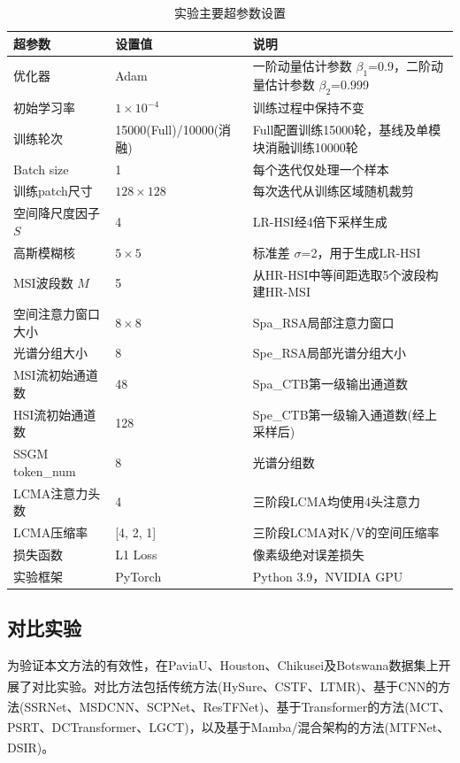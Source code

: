 \documentclass[UTF8,a4paper,11pt]{ctexart}
\newcommand{\upcite}[1]{\textsuperscript{\cite{#1}}}
\begin{document}
\begin{table}[!htbp]
\centering\small
\caption{实验主要超参数设置}
\label{tab:hyper}
\begin{tabularx}{\linewidth}{@{}llX@{}}
\toprule
超参数 & 设置值 & 说明 \\
\midrule
优化器           & Adam                      & 一阶动量估计参数 $\beta_1$=0.9，二阶动量估计参数 $\beta_2$=0.999 \\
初始学习率       & $1\times10^{-4}$          & 训练过程中保持不变 \\
训练轮次         & 15000(Full)/10000(消融)   & Full配置训练15000轮，基线及单模块消融训练10000轮 \\
Batch size       & 1                         & 每个迭代仅处理一个样本 \\
训练patch尺寸    & $128 \times 128$          & 每次迭代从训练区域随机裁剪 \\
空间降尺度因子 $S$ & 4                       & LR-HSI经4倍下采样生成 \\
高斯模糊核       & $5 \times 5$              & 标准差 $\sigma$=2，用于生成LR-HSI \\
MSI波段数 $M$    & 5                         & 从HR-HSI中等间距选取5个波段构建HR-MSI \\
空间注意力窗口大小 & $8 \times 8$            & Spa\_RSA局部注意力窗口 \\
光谱分组大小     & 8                         & Spe\_RSA局部光谱分组大小 \\
MSI流初始通道数  & 48                        & Spa\_CTB第一级输出通道数 \\
HSI流初始通道数  & 128                       & Spe\_CTB第一级输入通道数(经上采样后) \\
SSGM token\_num  & 8                         & 光谱分组数 \\
LCMA注意力头数   & 4                         & 三阶段LCMA均使用4头注意力 \\
LCMA压缩率       & [4, 2, 1]                 & 三阶段LCMA对K/V的空间压缩率 \\
损失函数         & L1 Loss                   & 像素级绝对误差损失 \\
实验框架         & PyTorch                   & Python 3.9，NVIDIA GPU \\
\bottomrule
\end{tabularx}
\end{table}

\subsection{对比实验}
为验证本文方法的有效性，在PaviaU、Houston、Chikusei及Botswana数据集上开展了对比实验。对比方法包括传统方法(HySure\upcite{ref6}、CSTF\upcite{ref17}、LTMR\upcite{ref18})、基于CNN的方法(SSRNet\upcite{ref8}、MSDCNN\upcite{ref19}、SCPNet\upcite{ref20}、ResTFNet\upcite{ref9})、基于Transformer的方法(MCT\upcite{ref11}、PSRT\upcite{ref21}、DCTransformer\upcite{ref22}、LGCT\upcite{ref13})，以及基于Mamba/混合架构的方法(MTFNet\upcite{ref23}、DSIR\upcite{ref24})。
\end{document}
